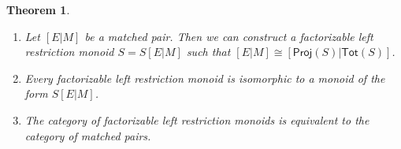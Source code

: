 \documentclass[a4paper]{amsart}
\newtheorem{theorem}{Theorem}[section]
\begin{document}
\begin{theorem}\mbox{}
\begin{enumerate} 

\item Let $[E|M]$ be a matched pair. Then we can construct a factorizable left restriction monoid $S = S[E|M]$
such that $[E|M] \cong [\mathsf{Proj}(S)|\mathsf{Tot}(S)]$.

\item Every factorizable left restriction monoid is isomorphic to a monoid of the form  $S[E|M]$.

\item The category of factorizable left restriction monoids is equivalent to the category of matched pairs. 

\end{enumerate}
\end{theorem}
\end{document}

